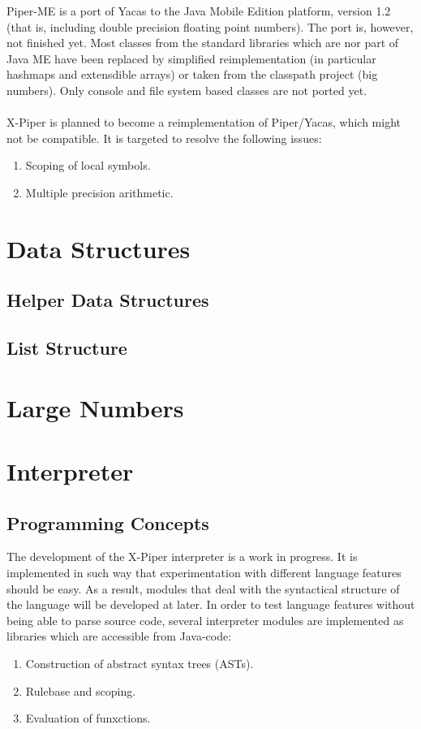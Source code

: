 Piper-ME is a port of Yacas to the Java Mobile Edition platform, version 1.2 
(that is, including double precision floating point numbers). The port is, however,
not finished yet. Most classes from the standard libraries which are nor part of
Java ME have been replaced by simplified reimplementation (in particular hashmaps
and extensdible arrays) or taken from the classpath project (big numbers). Only
console and file system based classes are not ported yet.\\
\\
X-Piper is planned to become a reimplementation of Piper/Yacas, which might
not be compatible. It is targeted to resolve the following issues:
\begin{enumerate}
\item Scoping of local symbols.
\item Multiple precision arithmetic.
\end{enumerate}


\chapter{Data Structures}

\section{Helper Data Structures}


\section{List Structure}



\chapter{Large Numbers}


\chapter{Interpreter}

\section{Programming Concepts}

The development of the X-Piper interpreter is a work in progress. It is implemented
in such way that experimentation with different language features should be easy.
As a result, modules that deal with the syntactical structure of the language will
be developed at later. In order to test language features without being able to
parse source code, several interpreter modules are implemented as libraries which
are accessible from Java-code:
\begin{enumerate}
\item Construction of abstract syntax trees (ASTs).
\item Rulebase and scoping.
\item Evaluation of funxctions.
\end{enumerate}

